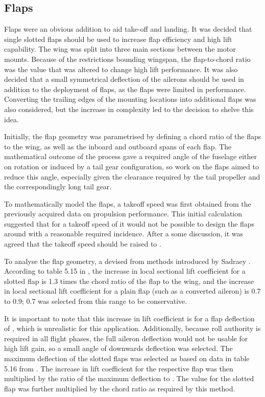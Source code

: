 \documentclass[../../main.tex]{subfiles}
\begin{document}
\subsection{Flaps} \label{sec:design-process:design-revision:flaps}


Flaps were an obvious addition to aid take-off and landing.
It was decided that single slotted flaps should be used to increase flap efficiency and high lift capability.
The wing was split into three main sections between the motor mounts.
Because of the restrictions bounding wingspan, the flap-to-chord ratio was the value that was altered to change high lift performance.
It was also decided that a small symmetrical deflection of the ailerons should be used in addition to the deployment of flaps, as the flaps were limited in performance.
Converting the trailing edges of the mounting locations into additional flaps was also considered, but the increase in complexity led to the decision to shelve this idea. 

Initially, the flap geometry was parametrised by defining a chord ratio of the flaps to the wing, as well as the inboard and outboard spans of each flap.
The mathematical outcome of the process gave a required angle of the fuselage either on rotation or induced by a tail gear configuration, so work on the flaps aimed to reduce this angle, especially given the clearance required by the tail propeller and the correspondingly long tail gear. 

To mathematically model the flaps, a takeoff speed was first obtained from the previously acquired data on propulsion performance.
This initial calculation suggested that for a takeoff speed of  it would not be possible to design the flaps around with a reasonable required incidence.
After a some discussion, it was agreed that the takeoff speed should be raised to . 

To analyse the flap geometry, a devised from methods introduced by Sadraey \cite{sadraey-13}.
According to table 5.15 in \cite{sadraey-13}, the increase in local sectional lift coefficient for a slotted flap is 1.3 times the chord ratio of the flap to the wing, and the increase in local sectional lift coefficient for a plain flap (such as a converted aileron) is 0.7 to 0.9; 0.7 was selected from this range to be conservative. 

It is important to note that this increase in lift coefficient is for a flap deflection of , which is unrealistic for this application.
Additionally, because roll authority is required in all flight phases, the full aileron deflection would not be usable for high lift gain, so a small angle of  downwards deflection was selected.
The maximum deflection of the slotted flaps was selected as  based on data in table 5.16 from \cite{sadraey-13}.
The increase in lift coefficient for the respective flap was then multiplied by the ratio of the maximum deflection to .
The value for the slotted flap was further multiplied by the chord ratio as required by this method. 
\end{document}
